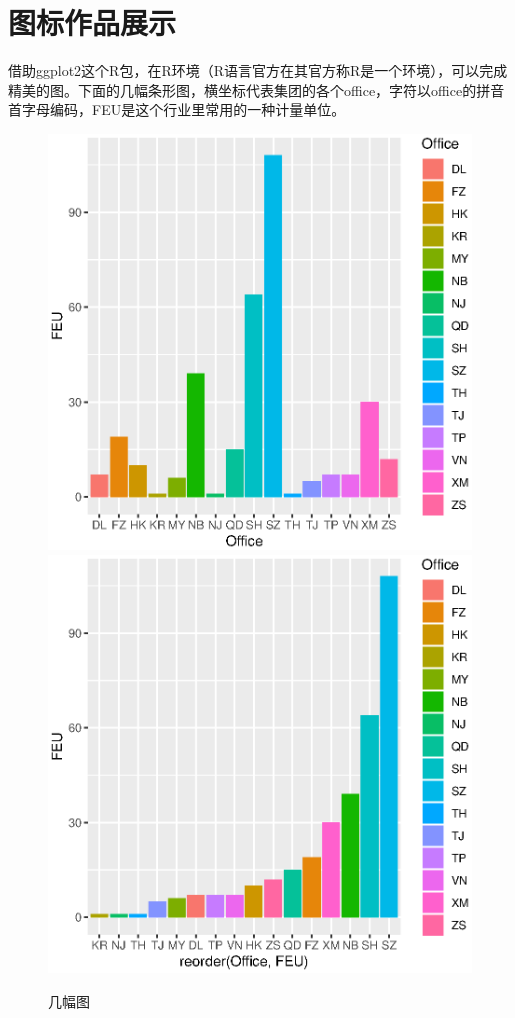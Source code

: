 \section{图标作品展示}
借助ggplot2这个R包，在R环境（R语言官方在其官方称R是一个环境），可以完成精美的图。下面的几幅条形图，横坐标代表集团的各个office，字符以office的拼音首字母编码，FEU是这个行业里常用的一种计量单位。
\begin{figure}[ht]
	\begin{center}
		\caption{几幅图}
		\includegraphics[scale=0.4]{eps/Rplot02}
		\qquad
		\includegraphics[scale=0.4]{eps/Rplot03} \\

\end{center}
\end{figure}

